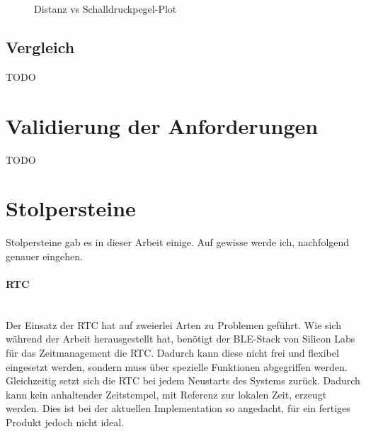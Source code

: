 \documentclass[12pt]{article}
\begin{document}
		\begin{figure}[H]
		\centering
			\caption{Distanz vs Schalldruckpegel-Plot}
			\label{fig:microphone_plot_distanz}
		\end{figure}
	\subsection{Vergleich}
	\color{red}TODO\color{black}
	
	\newpage
	\section{Validierung der Anforderungen}
	\color{red}TODO\color{black}
	
	\newpage
	\section{Stolpersteine}
	Stolpersteine gab es in dieser Arbeit einige. Auf gewisse werde ich, nachfolgend genauer eingehen.
	\paragraph{RTC}\mbox{}\\
	Der Einsatz der RTC hat auf zweierlei Arten zu Problemen geführt. Wie sich während der Arbeit herausgestellt hat, benötigt der BLE-Stack von Silicon Labs für das Zeitmanagement die RTC. Dadurch kann diese nicht frei und flexibel eingesetzt werden, sondern muss über spezielle Funktionen abgegriffen werden. Gleichzeitig setzt sich die RTC bei jedem Neustarts des Systems zurück. Dadurch kann kein anhaltender Zeitstempel, mit Referenz zur lokalen Zeit, erzeugt werden. Dies ist bei der aktuellen Implementation so angedacht, für ein fertiges Produkt jedoch nicht ideal.
\end{document}
